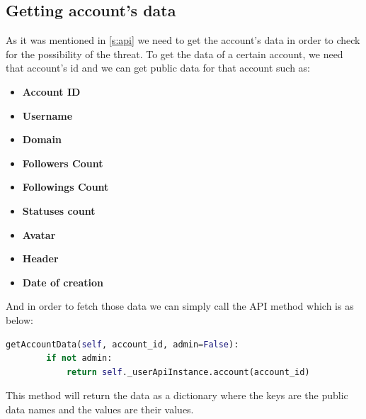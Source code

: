 \subsection{Getting account's data}\label{ss:acc_data}
As it was mentioned in \ref{s:api} we need to get the account's data in order to check for the possibility of the threat. To get the data of a certain account, we need that account's id and we can get public data for that account such as:
\begin{itemize}
	\item \textbf{Account ID}
	\item \textbf{Username}
	\item \textbf{Domain}
	\item \textbf{Followers Count}
	\item \textbf{Followings Count}
	\item \textbf{Statuses count}
	\item \textbf{Avatar}
	\item \textbf{Header}
	\item \textbf{Date of creation}
\end{itemize}
And in order to fetch those data we can simply call the API method which is as below:
\\[5pt]
\begin{lstlisting}[language=python, caption={Fetching certain account's public data}, captionpos=b]
	getAccountData(self, account_id, admin=False):
		if not admin:
			return self._userApiInstance.account(account_id)
\end{lstlisting}
This method will return the data as a dictionary where the keys are the public data names and the values are their values.
